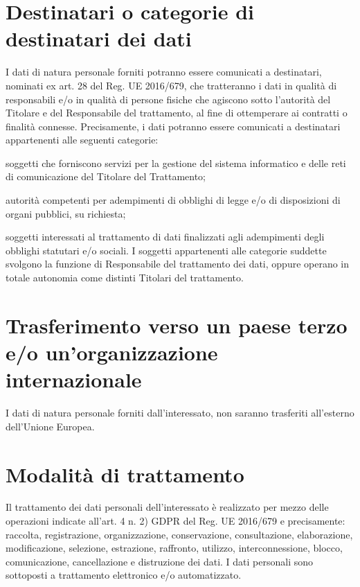 \documentclass[legalpaper, 11pt]{exam}
\let\tempone\enumerate
\let\temptwo\endenumerate
\renewenvironment{enumerate}{\tempone\addtolength{\itemsep}{-0.45\baselineskip}}{\temptwo}
\begin{document}
{\section{Destinatari o categorie di destinatari dei dati}
I dati di natura personale forniti potranno essere comunicati a destinatari, nominati ex art. 28 del Reg. UE 2016/679, che tratteranno i dati in qualità di responsabili e/o in qualità di persone fisiche che agiscono sotto l’autorità del Titolare e del Responsabile del trattamento, al fine di ottemperare ai contratti o finalità connesse. Precisamente, i dati potranno essere comunicati a destinatari appartenenti alle seguenti categorie:
\begin{enumerate}
	\item soggetti che forniscono servizi per la gestione del sistema informatico e delle reti di comunicazione del Titolare del Trattamento;
	\item autorità competenti per adempimenti di obblighi di legge e/o di disposizioni di organi pubblici, su richiesta;
	\item soggetti interessati al trattamento di dati finalizzati agli adempimenti degli obblighi statutari e/o sociali.
\end{enumerate}
I soggetti appartenenti alle categorie suddette svolgono la funzione di Responsabile del trattamento dei dati, oppure operano in totale autonomia come distinti Titolari del trattamento.

\newpage
\section{Trasferimento verso un paese terzo e/o un'organizzazione internazionale}
I dati di natura personale forniti dall’interessato, non saranno trasferiti all’esterno dell’Unione Europea.

\section{Modalità di trattamento}
Il trattamento dei dati personali dell’interessato è realizzato per mezzo delle operazioni indicate all’art. 4 n. 2) GDPR del Reg. UE 2016/679 e precisamente: raccolta, registrazione, organizzazione, conservazione, consultazione, elaborazione, modificazione, selezione, estrazione, raffronto, utilizzo, interconnessione, blocco, comunicazione, cancellazione e distruzione dei dati. I dati personali sono sottoposti a trattamento elettronico e/o automatizzato.

}
\end{document}
